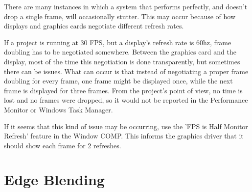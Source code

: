 \begin{fullwidth}
There are many instances in which a system that performs perfectly, and doesn't drop a single frame, will occasionally stutter. This may occur because of how displays and graphics cards negotiate different refresh rates. 

If a project is running at 30 FPS, but a display's refresh rate is 60hz, frame doubling has to be negotiated somewhere. Between the graphics card and the display, most of the time this negotiation is done transparently, but sometimes there can be issues. What can occur is that instead of negotiating a proper frame doubling for every frame, one frame might be displayed once, while the next frame is displayed for three frames. From the project's point of view, no time is lost and no frames were dropped, so it would not be reported in the Performance Monitor or Windows Task Manager. 

If it seems that this kind of issue may be occurring, use the 'FPS is Half Monitor Refresh' feature in the Window COMP. This informs the graphics driver that it should show each frame for 2 refreshes.


\end{fullwidth}




\section{Edge Blending}

